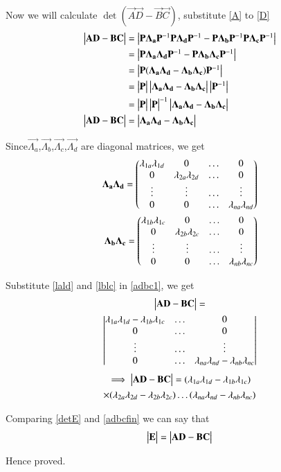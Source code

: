 \documentclass[journal,12pt,twocolumn]{IEEEtran}
\begin{document}
Now we will calculate $\det(\vec{A}\vec{D}-\vec{B}\vec{C})$, substitute \eqref{A} to \eqref{D}
\begin{align}
    \begin{vmatrix}\mathbf{A}\mathbf{D}-\mathbf{B}\mathbf{C}\end{vmatrix}&=\begin{vmatrix}\mathbf{P}\mathbf{\Lambda_a}\mathbf{P}^{-1}\mathbf{P}\mathbf{\Lambda_d}\mathbf{P}^{-1}-\mathbf{P}\mathbf{\Lambda_b}\mathbf{P}^{-1}\mathbf{P}\mathbf{\Lambda_c}\mathbf{P}^{-1}\end{vmatrix}\\
    &=\begin{vmatrix}\mathbf{P}\mathbf{\Lambda_a}\mathbf{\Lambda_d}\mathbf{P}^{-1}-\mathbf{P}\mathbf{\Lambda_b}\mathbf{\Lambda_c}\mathbf{P}^{-1}\end{vmatrix}\\
    &=\begin{vmatrix}\mathbf{P}(\mathbf{\Lambda_a}\mathbf{\Lambda_d}-\mathbf{\Lambda_b}\mathbf{\Lambda_c})\mathbf{P}^{-1}\end{vmatrix}\\
    &=\begin{vmatrix}\mathbf{P}\end{vmatrix}\begin{vmatrix}\mathbf{\Lambda_a}\mathbf{\Lambda_d}-\mathbf{\Lambda_b}\mathbf{\Lambda_c}\end{vmatrix}\begin{vmatrix}\mathbf{P}^{-1}\end{vmatrix}\\
    &=\begin{vmatrix}\mathbf{P}\end{vmatrix}\begin{vmatrix}\mathbf{P}\end{vmatrix}^{-1}\begin{vmatrix}\mathbf{\Lambda_a}\mathbf{\Lambda_d}-\mathbf{\Lambda_b}\mathbf{\Lambda_c}\end{vmatrix}\\
    \begin{vmatrix}\mathbf{A}\mathbf{D}-\mathbf{B}\mathbf{C}\end{vmatrix}&=\begin{vmatrix}\mathbf{\Lambda_a}\mathbf{\Lambda_d}-\mathbf{\Lambda_b}\mathbf{\Lambda_c}\end{vmatrix}\label{adbc1}
\end{align}

Since$\vec{\Lambda_a}$,$\vec{\Lambda_b}$,$\vec{\Lambda_c}$,$\vec{\Lambda_d}$ are diagonal matrices, we get
\begin{align}
    \mathbf{\Lambda_a}\mathbf{\Lambda_d}=\begin{pmatrix}\lambda_{1a}\lambda_{1d}&0&\dots&0\\0&\lambda_{2a}\lambda_{2d}&\dots&0\\\vdots&\vdots&\dots&\vdots\\0&0&\dots&\lambda_{na}\lambda_{nd}\end{pmatrix}\label{lald}\\
    \mathbf{\Lambda_b}\mathbf{\Lambda_c}=\begin{pmatrix}\lambda_{1b}\lambda_{1c}&0&\dots&0\\0&\lambda_{2b}\lambda_{2c}&\dots&0\\\vdots&\vdots&\dots&\vdots\\0&0&\dots&\lambda_{nb}\lambda_{nc}\end{pmatrix}\label{lblc}\\
\end{align}

Substitute \eqref{lald} and \eqref{lblc} in \eqref{adbc1}, we get
\begin{multline}
    \begin{vmatrix}\mathbf{A}\mathbf{D}-\mathbf{B}\mathbf{C}\end{vmatrix}=\\\begin{vmatrix}\lambda_{1a}\lambda_{1d}-\lambda_{1b}\lambda_{1c}&\dots&0\\0&\dots&0\\\vdots&\dots&\vdots\\0&\dots&\lambda_{na}\lambda_{nd}-\lambda_{nb}\lambda_{nc}\end{vmatrix}
\end{multline}
\begin{multline}
    \implies\begin{vmatrix}\mathbf{A}\mathbf{D}-\mathbf{B}\mathbf{C}\end{vmatrix}=(\lambda_{1a}\lambda_{1d}-\lambda_{1b}\lambda_{1c})\\\times(\lambda_{2a}\lambda_{2d}-\lambda_{2b}\lambda_{2c})\dots(\lambda_{na}\lambda_{nd}-\lambda_{nb}\lambda_{nc})\label{adbcfin}
\end{multline}

Comparing \eqref{detE} and \eqref{adbcfin} we can say that
\begin{align}
    \begin{vmatrix}\mathbf{E}\end{vmatrix}=\begin{vmatrix}\mathbf{A}\mathbf{D}-\mathbf{B}\mathbf{C}\end{vmatrix}
\end{align}

Hence proved.
\end{document}
